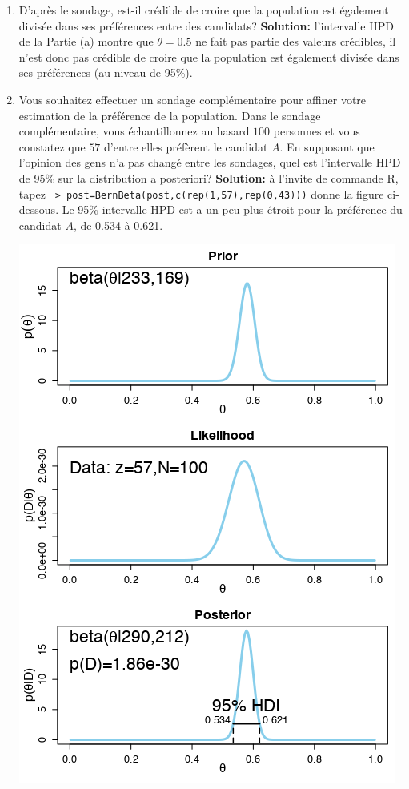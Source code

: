 \begin{Exemple}
\begin{enumerate}[noitemsep,label=(\alph*)]
\begin{center}
\end{center}
\item  D'apr\`es le sondage, est-il cr\'edible de croire que la population est \'egalement divis\'ee dans ses pr\'ef\'erences entre des candidats? \newl \textbf{Solution:} l'intervalle HPD de la Partie (a) montre que $\theta=0.5$ ne fait pas partie des valeurs cr\'edibles, il n'est donc pas cr\'edible de croire que la population est \'egalement divis\'ee dans ses pr\'ef\'erences (au niveau de 95\%).
\item Vous souhaitez effectuer un sondage compl\'ementaire pour affiner votre estimation de la pr\'ef\'erence de la population. Dans le sondage compl\'ementaire, vous \'echantillonnez au hasard $100$ personnes et vous constatez que $57$ d'entre elles pr\'ef\`erent le candidat $A$. En supposant que l'opinion des gens n'a pas chang\'e entre les sondages, quel est l'intervalle HPD de 95\% sur la distribution a posteriori? \newl \textbf{Solution:} 
\`a l'invite de commande R, tapez \newl \footnotesize \texttt{
> post=BernBeta(post,c(rep(1,57),rep(0,43)))}\normalsize \newl
donne la figure ci-dessous. Le 95\% intervalle HPD est a un peu plus \'etroit pour la pr\'ef\'erence du candidat $A$, de 0.534 \`a 0.621.
\begin{center}\includegraphics[width=\linewidth]{Images/example8b.png}\end{center}

\end{enumerate}
\end{Exemple}

